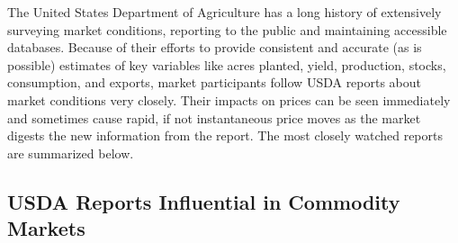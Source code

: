 \documentclass[]{book}
\theoremstyle{definition}
\theoremstyle{definition}
\theoremstyle{remark}
\begin{document}
The United States Department of Agriculture has a long history of
extensively surveying market conditions, reporting to the public and
maintaining accessible databases. Because of their efforts to provide
consistent and accurate (as is possible) estimates of key variables like
acres planted, yield, production, stocks, consumption, and exports,
market participants follow USDA reports about market conditions very
closely. Their impacts on prices can be seen immediately and sometimes
cause rapid, if not instantaneous price moves as the market digests the
new information from the report. The most closely watched reports are
summarized below.

\subsection{USDA Reports Influential in Commodity
Markets}\label{usda-reports-influential-in-commodity-markets}
\end{document}

